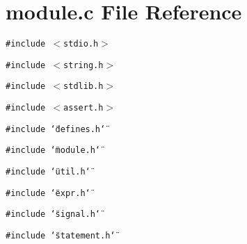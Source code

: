 \section{module.c File Reference}
\label{module_8c}
{\tt \#include $<$stdio.h$>$}\par
{\tt \#include $<$string.h$>$}\par
{\tt \#include $<$stdlib.h$>$}\par
{\tt \#include $<$assert.h$>$}\par
{\tt \#include \char`\"{}defines.h\char`\"{}}\par
{\tt \#include \char`\"{}module.h\char`\"{}}\par
{\tt \#include \char`\"{}util.h\char`\"{}}\par
{\tt \#include \char`\"{}expr.h\char`\"{}}\par
{\tt \#include \char`\"{}signal.h\char`\"{}}\par
{\tt \#include \char`\"{}statement.h\char`\"{}}\par
